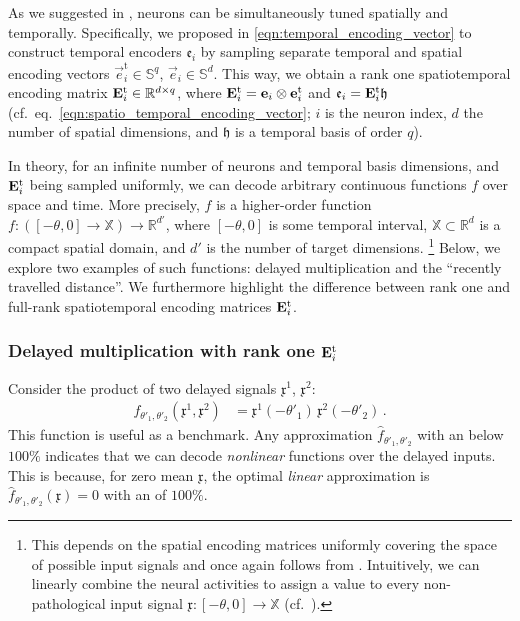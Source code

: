 As we suggested in , neurons can be simultaneously tuned spatially and temporally.
Specifically, we proposed in \cref{eqn:temporal_encoding_vector} to construct temporal encoders $\mathfrak{e}_i$ by sampling separate temporal and spatial encoding vectors $\vec e^\mathrm{t}_i \in \mathbb{S}^q$, $\vec e_i \in \mathbb{S}^d$.
This way, we obtain a rank one spatiotemporal encoding matrix $\mathbf{E}_i^\mathrm{t} \in \mathbb{R}^{d \times q}$, where $\mathbf{E}_i^\mathrm{t} = \mathbf{e}_i \otimes \mathbf{e}^\mathrm{t}_i$ and $\mathfrak{e}_i = \mathbf{E}_i^\mathrm{t} \mathfrak{h}$ (cf.~eq.~\ref{eqn:spatio_temporal_encoding_vector}; $i$ is the neuron index, $d$ the number of spatial dimensions, and $\mathfrak{h}$ is a temporal basis of order $q$).

In theory, for an infinite number of neurons and temporal basis dimensions, and $\mathbf{E}_i^\mathrm{t}$ being sampled uniformly, we can decode arbitrary continuous functions $f$ over space and time.
More precisely, $f$ is a higher-order function $f : ([-\theta, 0] \longrightarrow \mathbb{X}) \longrightarrow \mathbb{R}^{d'}$, where $[-\theta, 0]$ is some temporal interval, $\mathbb{X} \subset \mathbb{R}^d$ is a compact spatial domain, and $d'$ is the number of target dimensions.%
\footnote{
This depends on the spatial encoding matrices uniformly covering the space of possible input signals and once again follows from \citet{hornik1989multilayer}.
Intuitively, we can linearly combine the neural activities to assign a value to every non-pathological input signal $\mathfrak{x} : [-\theta, 0] \longrightarrow \mathbb{X}$ (cf.~).}
Below, we explore two examples of such functions: delayed multiplication and the \enquote{recently travelled distance}.
We furthermore highlight the difference between rank one and full-rank spatiotemporal encoding matrices $\mathbf{E}_i^\mathrm{t}$.

\subsubsection{Delayed multiplication with rank one $\mathbf{E}_i^\mathrm{t}$}
Consider the product of two delayed signals $\mathfrak{x}^1$, $\mathfrak{x}^2$:
\begin{align*}
	f_{\theta'_1, \theta'_2}(\mathfrak{x}^1, \mathfrak{x}^2) &= \mathfrak{x}^1 (- \theta'_1) \, \mathfrak{x}^2 (- \theta'_2) \,.
\end{align*}
This function is useful as a benchmark.
Any approximation $\hat f_{\theta'_1, \theta'_2}$ with an \NRMSE below $100\%$ indicates that we can decode \emph{nonlinear} functions over the delayed inputs.
This is because, for zero mean $\mathfrak{x}$, the optimal \emph{linear} approximation is $\hat f_{\theta'_1, \theta'_2}(\mathfrak{x}) = 0$ with an \NRMSE of $100\%$.

